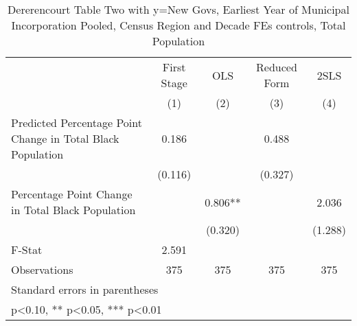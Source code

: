 \begin{table}[htbp]\centering
\def\sym#1{\ifmmode^{#1}\else\(^{#1}\)\fi}
\caption{Dererencourt Table Two with y=New Govs, Earliest Year of Municipal Incorporation  Pooled, Census Region and Decade FEs controls, Total Population}
\begin{tabular}{l*{4}{c}}
\toprule
                    & First Stage   &         OLS   &Reduced Form   &        2SLS   \\
                    &\multicolumn{1}{c}{(1)}   &\multicolumn{1}{c}{(2)}   &\multicolumn{1}{c}{(3)}   &\multicolumn{1}{c}{(4)}   \\
\midrule
Predicted Percentage Point Change in Total Black Population&       0.186   &               &       0.488   &               \\
                    &     (0.116)   &               &     (0.327)   &               \\
\addlinespace
Percentage Point Change in Total Black Population&               &       0.806** &               &       2.036   \\
                    &               &     (0.320)   &               &     (1.288)   \\
\midrule
F-Stat              &       2.591   &               &               &               \\
Observations        &         375   &         375   &         375   &         375   \\
\bottomrule
\multicolumn{5}{l}{\footnotesize Standard errors in parentheses}\\
\multicolumn{5}{l}{\footnotesize * p<0.10, ** p<0.05, *** p<0.01}\\
\end{tabular}
\end{table}
